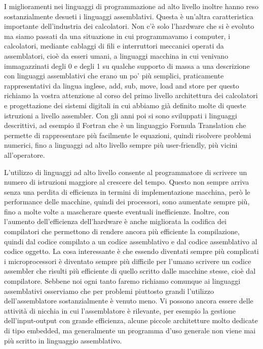 I miglioramenti nei linguaggi di programmazione ad alto livello inoltre hanno reso sostanzialmente desueti i linguaggi assemblativi.
Questa è un'altra caratteristica importante dell'industria dei calcolatori.
Non c'è solo l'hardware che si è evoluto ma siamo passati da una situazione in cui programmavamo i computer, i calcolatori, mediante cablaggi di fili e interruttori meccanici operati da assemblatori, cioè da esseri umani, a linguaggi macchina in cui venivano immagazzinati degli 0 e degli 1 su qualche supporto di massa a una descrizione con linguaggi assemblativi che erano un po' più semplici, praticamente rappresentativi da lingua inglese, add, sub, move, load and store per questo richiamo la vostra attenzione al corso del primo livello architettura dei calcolatori e progettazione dei sistemi digitali in cui abbiamo già definito molte di queste istruzioni a livello assembler.
Con gli anni poi si sono sviluppati i linguaggi descrittivi, ad esempio il Fortran che è un linguaggio Formula Translation che permette di rappresentare più facilmente le equazioni, quindi risolvere problemi numerici, fino a linguaggi ad alto livello sempre più user-friendly, più vicini all'operatore.

L'utilizzo di linguaggi ad alto livello consente al programmatore di scrivere un numero di istruzioni maggiore al crescere del tempo.
Questo non sempre arriva senza una perdita di efficienza in termini di implementazione macchina, però le performance delle macchine, quindi dei processori, sono aumentate sempre più, fino a molte volte a mascherare queste eventuali inefficienze.
Inoltre, con l'aumento dell'efficienza dell'hardware è anche migliorata la codifica dei compilatori che permettono di rendere ancora più efficiente la compilazione, quindi dal codice compilato a un codice assemblativo e dal codice assemblativo al codice oggetto.
La cosa interessante è che essendo diventati sempre più complicati i microprocessori è diventato sempre più difficile per l'umano scrivere un codice assembler che risulti più efficiente di quello scritto dalle macchine stesse, cioè dal compilatore.
Sebbene noi ogni tanto faremo richiamo comunque ai linguaggi assemblativi osserviamo che per problemi piuttosto grandi l'utilizzo dell'assemblatore sostanzialmente è venuto meno.
Vi possono ancora essere delle attività di nicchia in cui l'assemblatore è rilevante, per esempio la gestione dell'input-output con grande efficienza, alcune piccole architetture molto dedicate di tipo embedded, ma generalmente un programma d'uso generale non viene mai più scritto in linguaggio assemblativo.

